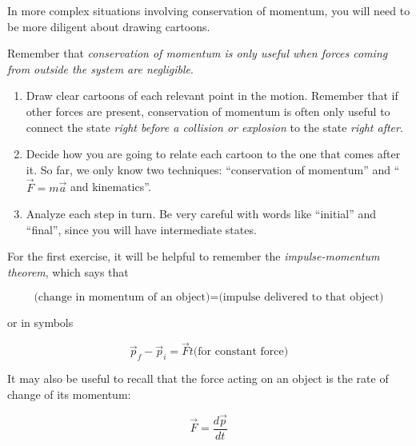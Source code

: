 \documentclass[12pt]{article}
\begin{document}
\Large
\centerline{}

\normalsize
\centerline{}

In more complex situations involving conservation of momentum, you will need to be more diligent about drawing cartoons.

Remember that {\it conservation of momentum is only useful when forces coming from outside the system are negligible}. 

\begin{enumerate}
	\item Draw clear cartoons of each relevant point in the motion. Remember that if other forces are present, conservation of momentum is often only useful to connect the state {\it right before a collision or explosion} to the state {\it right after}.
	\item Decide how you are going to relate each cartoon to the one that comes after it. So far, we only know two techniques: ``conservation of momentum'' and ``$\vec F = m \vec a$ and kinematics''.
	\item Analyze each step in turn. Be very careful with words like ``initial'' and ``final'', since you will have intermediate states.
\end{enumerate}

\bigskip\bigskip

For the first exercise, it will be helpful to remember the {\it impulse-momentum theorem}, which says that 

$$\text{(change in momentum of an object)} = \text{(impulse delivered to that object)}$$

or in symbols

$$\vec p_f - \vec p_i = \vec F t \text{(for constant force)}$$

It may also be useful to recall that the force acting on an object is the rate of change of its momentum:

$$\vec F = \frac{d\vec p}{dt}$$


\newpage
\end{document}
